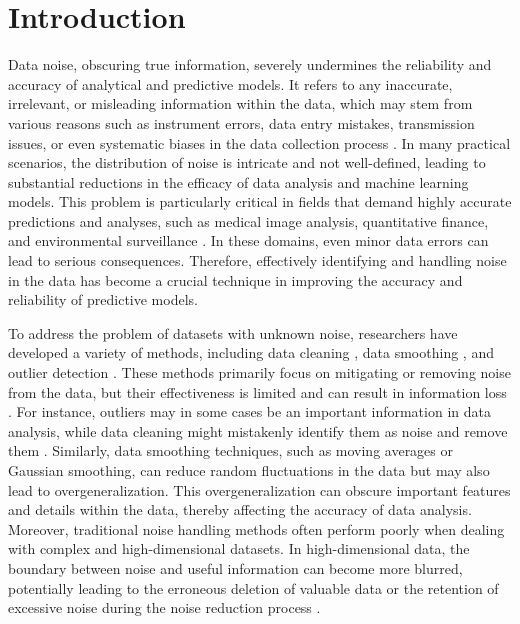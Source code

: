 \documentclass[final,3p,times]{elsarticle}
\begin{document}

\section{Introduction}
Data noise, obscuring true information, severely 
undermines the reliability and accuracy of analytical and predictive 
models. It refers to any inaccurate, irrelevant, or misleading 
information within the data, which may stem from various reasons such 
as instrument errors, data entry mistakes, transmission issues, or even 
systematic biases in the data collection process \cite{bib2,bib3}. In many practical 
scenarios, the distribution of noise is intricate and not well-defined, 
leading to substantial reductions in the efficacy of data analysis 
and machine learning models. This problem is particularly critical 
in fields that demand highly accurate predictions and analyses, 
such as medical image analysis, quantitative finance, and 
environmental surveillance \cite{bib4,bib5}. In these domains, even minor data 
errors can lead to serious consequences. Therefore, effectively 
identifying and handling noise in the data has become a crucial 
technique in improving the accuracy and reliability of predictive 
models.

To address the problem of datasets with unknown noise, researchers 
have developed a variety of methods, including data cleaning \cite{bib7,bib8}, 
data smoothing \cite{bib9,bib11}, and outlier detection \cite{bib12}. These methods 
primarily focus on mitigating or removing noise from the data, but 
their effectiveness is limited and can result in information loss \cite{bib14}. 
For instance, outliers may in some cases be an important information 
in data analysis, while data cleaning might mistakenly identify them 
as noise and remove them \cite{bib15}. Similarly, data smoothing techniques, 
such as moving averages or Gaussian smoothing, can reduce random 
fluctuations in the data but may also lead to overgeneralization. 
This overgeneralization can obscure important features and details 
within the data, thereby affecting the accuracy of data analysis. 
Moreover, traditional noise handling methods often perform poorly 
when dealing with complex and high-dimensional datasets. In 
high-dimensional data, the boundary between noise and useful 
information can become more blurred, potentially leading to the erroneous deletion 
of valuable data or the retention of excessive noise during the noise 
reduction process \cite{bib16}.
\end{document}
